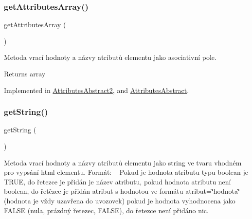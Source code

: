 \subsubsection{\texorpdfstring{get\+Attributes\+Array()}{getAttributesArray()}}
{\footnotesize\ttfamily get\+Attributes\+Array (\begin{DoxyParamCaption}{ }\end{DoxyParamCaption})}

Metoda vrací hodnoty a názvy atributů elementu jako asociativní pole. \begin{DoxyReturn}{Returns}
array 
\end{DoxyReturn}


Implemented in \mbox{\hyperlink{class_pes_1_1_dom_1_1_node_1_1_attributes_1_1_attributes_abstract2_a777187fb39c10ae49a97e9bd1878bf0f}{Attributes\+Abstract2}}, and \mbox{\hyperlink{class_pes_1_1_dom_1_1_node_1_1_attributes_1_1_attributes_abstract_a777187fb39c10ae49a97e9bd1878bf0f}{Attributes\+Abstract}}.

\mbox{\label{interface_pes_1_1_dom_1_1_node_1_1_attributes_1_1_attributes_interface_afde980915cc78c408e6ac75b662e631c}} 
\subsubsection{\texorpdfstring{get\+String()}{getString()}}
{\footnotesize\ttfamily get\+String (\begin{DoxyParamCaption}{ }\end{DoxyParamCaption})}

Metoda vrací hodnoty a názvy atributů elementu jako string ve tvaru vhodném pro vypsání html elementu. Formát\+: ~\newline
 Pokud je hodnota atributu typu boolean je T\+R\+UE, do řetezce je přidán je název atributu, pokud hodnota atributu není boolean, do řetězce je přidán atribut s hodnotou ve formátu atribut=\char`\"{}hodnota\char`\"{} (hodnota je vždy uzavřena do uvozovek) pokud je hodnota vyhodnocena jako F\+A\+L\+SE (nula, prázdný řetezec, F\+A\+L\+SE), do řetezce není přidáno nic.

